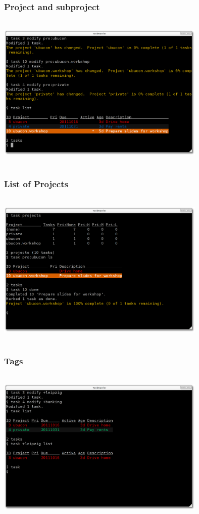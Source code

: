 \documentclass[t,handout]{beamer}
\begin{document}
\begin{frame}
\frametitle{Project and subproject}
\begin{center}
\includegraphics[width=10cm,height=7.5cm]{project_and_subproject.png}
\end{center}
\end{frame}

\begin{frame}
\frametitle{List of Projects}
\begin{center}
\includegraphics[width=10cm,height=7.5cm]{projects.png}
\end{center}
\end{frame}

\begin{frame}
\frametitle{Tags}
\begin{center}
\includegraphics[width=10cm,height=7.5cm]{tags.png}
\end{center}
\end{frame}
\end{document}
